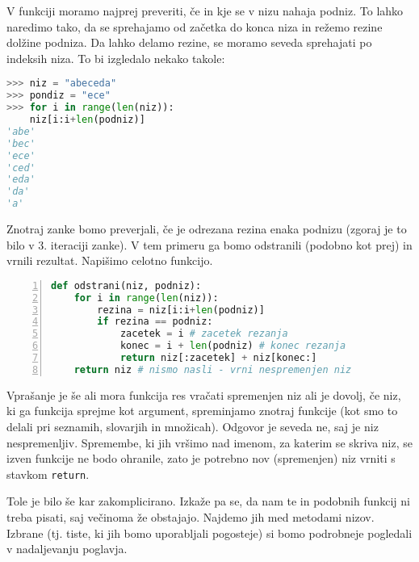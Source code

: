 \begin{resitev}
V funkciji moramo najprej preveriti, če in kje se v nizu nahaja podniz. To lahko naredimo tako, da se sprehajamo od začetka do konca niza in režemo rezine dolžine podniza. Da lahko delamo rezine, se moramo seveda sprehajati po indeksih niza. To bi izgledalo nekako takole:
\begin{lstlisting}[language=Python, showstringspaces=false]
>>> niz = "abeceda"
>>> pondiz = "ece"
>>> for i in range(len(niz)):
	niz[i:i+len(podniz)]
'abe'
'bec'
'ece'
'ced'
'eda'
'da'
'a'
\end{lstlisting}
Znotraj zanke bomo preverjali, če je odrezana rezina enaka podnizu (zgoraj je to bilo v 3. iteraciji zanke). V tem primeru ga bomo odstranili (podobno kot prej) in vrnili rezultat. Napišimo celotno funkcijo.
\begin{lstlisting}[language=Python, showstringspaces=false,numbers=left]
def odstrani(niz, podniz):
    for i in range(len(niz)):
        rezina = niz[i:i+len(podniz)]
        if rezina == podniz:
            zacetek = i # zacetek rezanja
            konec = i + len(podniz) # konec rezanja
            return niz[:zacetek] + niz[konec:]
    return niz # nismo nasli - vrni nespremenjen niz
\end{lstlisting}
Vprašanje je še ali mora funkcija res vračati spremenjen niz ali je dovolj, če niz, ki ga funkcija sprejme kot argument, spreminjamo znotraj funkcije (kot smo to delali pri seznamih, slovarjih in množicah). Odgovor je seveda ne, saj je niz nespremenljiv. Spremembe, ki jih vršimo nad imenom, za katerim se skriva niz, se izven funkcije ne bodo ohranile, zato je potrebno nov (spremenjen) niz vrniti s stavkom \texttt{return}. 
\end{resitev}

Tole je bilo še kar zakomplicirano. Izkaže pa se, da nam te in podobnih funkcij ni treba pisati, saj večinoma že obstajajo. Najdemo jih med metodami nizov. Izbrane (tj. tiste, ki jih bomo uporabljali pogosteje) si bomo podrobneje pogledali v nadaljevanju poglavja.

